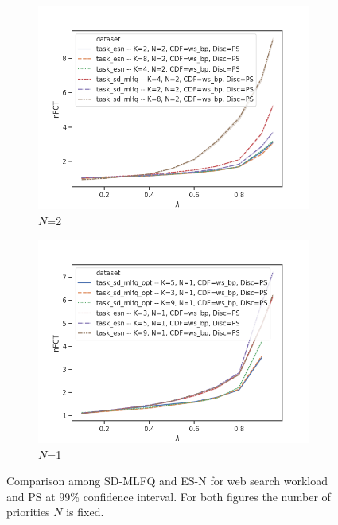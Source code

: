 \begin{figure}[!tb]
	\centering
	\begin{subfigure}{.5\textwidth}								   
		\includegraphics[width=0.99\textwidth]{Chapter3/Figures/comparison_esn_vs_mlfq_ps_vs_servers}
		\caption{$N$=2}	
		\label{fig:esn-vs-sdmlfq-ps-fixed-N-2}
	\end{subfigure}%
	\hfill
	\begin{subfigure}{.5\textwidth}			
		\centering
		\includegraphics[width=0.99\textwidth]{Chapter3/Figures/comparison_esn_vs_mlfq_ps_n11}
		\caption{$N$=1}
		\label{fig:esn-vs-sdmlfq-ps-fixed-N-1}
	\end{subfigure}%
	\caption{Comparison among SD-MLFQ and ES-N for web search workload and PS at 99\% confidence interval. For both figures the number of priorities $N$ is fixed.}	
	\label{fig:esn-vs-sdmlfq-ps-fixed-N}
\end{figure}%
